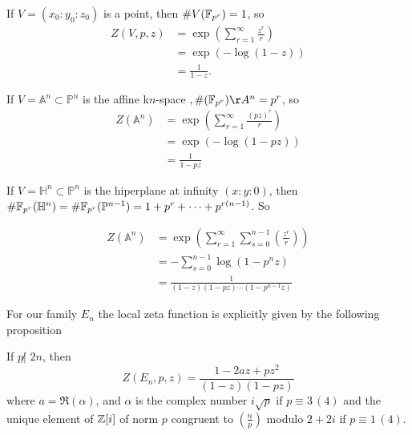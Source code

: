 \documentclass[12pt, a4paper]{amsart}
\begin{document}
\begin{example}
  If $V = (x_0:y_0:z_0)$ is a point, then $\#V(\mathbb{F}_{p^r}) = 1$, so
  \begin{equation*}
    \begin{split}
      Z(V,p,z) &= \exp \left( \sum\limits_{r=1}^{\infty} \frac{z^r}{r} \right) \\
               &= \exp (-\log (1-z)) \\
               &= \frac{1}{1-z}.
    \end{split}
  \end{equation*}
             
\end{example}

\begin{example}
  If $V = \mathbb{A}^n \subset \mathbb{P}^n$ is the affine
  k$n$-space $, \#(\FF_{p^r})\AA^n = p^r$, so
  \begin{equation*}
    \begin{split}
      Z(\mathbb{A}^n) &= \exp \left(  \sum\limits_{r=1}^\infty \frac{(pz)^r}{r} \right) \\
      &= \exp ( - \log (1-pz) ) \\
      &= \frac{1}{1-pz}
    \end{split}
  \end{equation*}
\end{example}

\begin{example}
  If $V = \mathbb{H}^n \subset \mathbb{P}^n$ is the hiperplane at infinity
  $(x:y:0)$, then $\# \mathbb{F}_{p^r} (\mathbb{H}^n) = \# \mathbb{F}_{p^r} (\mathbb{P}^{n-1})
  = 1 + p^r + \cdots + p^{r(n-1)}$. So

  \begin{equation*}
    \begin{split}
      Z(\mathbb{A}^n) &= \exp \left(  \sum\limits_{r=1}^\infty
        \sum\limits_{s=0}^{n-1} \left(  \frac{z^r}{r}  \right) \right) \\
      &= - \sum\limits_{s=0}^{n-1} \log (1 - p^n z) \\
      &= \frac{1}{(1-z) (1-pz) \cdots (1-p^{n-1} z)}
    \end{split}
  \end{equation*}
\end{example}
  
For our family $E_n$ the local zeta function is explicitly given by the
following proposition

\begin{prop}
  If $p \not| \,\, 2n$, then
  \[Z(E_n, p, z) = \frac{1 - 2az + pz^2}{(1-z)(1-pz)} \]
  where $a = \Re(\alpha)$, and $\alpha$ is the complex number
  $i\sqrt{p}$ if $p \equiv 3 \, (4)$ and the unique element of ${\mathbb Z}[i]$ of
  norm $p$ congruent to $(\frac{n}{p})$ modulo $2+2i$ if $p \equiv 1 \, (4)$. 
\end{prop}
\end{document}
